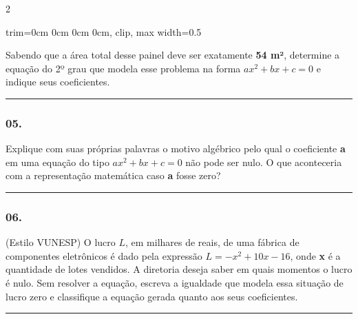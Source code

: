 \documentclass[twoside, 10pt, a4paper]{article}
\newlength{\espacoPreQuestao}\setlength{\espacoPreQuestao}{0.1cm}
\newlength{\espacoQuestao}\setlength{\espacoQuestao}{0.2cm}
\begin{document}
\begin{multicols*}{2}
\begin{center}
\begin{adjustbox}{trim=0cm 0cm 0cm 0cm, clip, max width=0.5\linewidth}
\end{adjustbox}
\end{center}

Sabendo que a área total desse painel deve ser exatamente \textbf{54 m²}, determine a equação do 2º grau que modela esse problema na forma $ ax^2 + bx + c = 0 $ e indique seus coeficientes.
\par\vspace{\espacoQuestao}

\noindent\textcolor{CorLinha}{\rule{\linewidth}{0.5pt}} 
\par\vspace{\espacoPreQuestao}
\subsubsection*{05.} Explique com suas próprias palavras o motivo algébrico pelo qual o coeficiente \textbf{a} em uma equação do tipo $ ax^2 + bx + c = 0 $ não pode ser nulo. O que aconteceria com a representação matemática caso \textbf{a} fosse zero?
\par\vspace{\espacoQuestao}

\noindent\textcolor{CorLinha}{\rule{\linewidth}{0.5pt}} 
\par\vspace{\espacoPreQuestao}
\subsubsection*{06.} (Estilo VUNESP) O lucro $ L $, em milhares de reais, de uma fábrica de componentes eletrônicos é dado pela expressão $ L = -x^2 + 10x - 16 $, onde \textbf{x} é a quantidade de lotes vendidos. A diretoria deseja saber em quais momentos o lucro é nulo. Sem resolver a equação, escreva a igualdade que modela essa situação de lucro zero e classifique a equação gerada quanto aos seus coeficientes.
\par\vspace{\espacoQuestao}

\noindent\textcolor{CorLinha}{\rule{\linewidth}{0.5pt}} 
\par\vspace{\espacoPreQuestao}

\end{multicols*}
\end{document}
